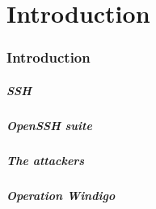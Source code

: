 \part{Introduction}
\section{Introduction}

\begin{frame}
	\partpage
\end{frame}

\begin{frame}
	\frametitle{SSH}
\end{frame}

\begin{frame}
	\frametitle{OpenSSH suite}
\end{frame}

\begin{frame}
	\frametitle{The attackers}
\end{frame}

\begin{frame}
	\frametitle{Operation Windigo}
\end{frame}
